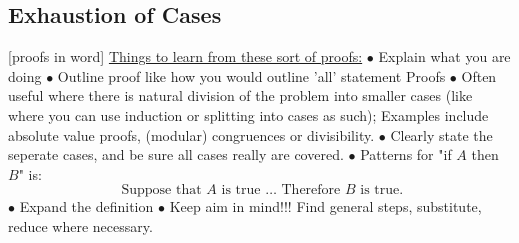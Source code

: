 \documentclass{article}
\begin{document}
\subsection{Exhaustion of Cases}
[proofs in word]
\newline
\newline
\underline{Things to learn from these sort of proofs:}
\newline
$\bullet$ Explain what you are doing
\newline
$\bullet$ Outline proof like how you would outline 'all' statement Proofs
\newline
$\bullet$ Often useful where there is natural division of the problem into smaller cases (like where you can use induction or splitting into cases as such);
\newline
Examples include absolute value proofs, (modular) congruences or divisibility.
\newline
$\bullet$ Clearly state the seperate cases, and be sure all cases really are covered.
\newline
$\bullet$ Patterns for "if $A$ then $B$" is:
$$\text{ Suppose that $A$ is true } \dots \text{ Therefore $B$ is true.}$$
\newline
$\bullet$ Expand the definition
\newline
$\bullet$ Keep aim in mind!!! Find general steps, substitute, reduce where necessary.
\newpage
\end{document}
